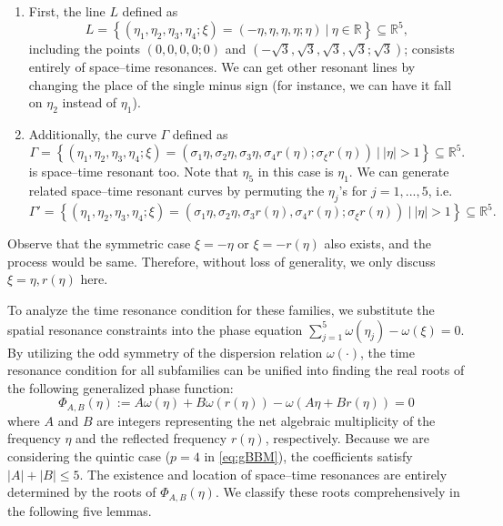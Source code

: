 \documentclass[reqno,english,11pt]{amsart}
\theoremstyle{definition}
\numberwithin{equation}{section}
\begin{document}
\begin{enumerate}
    \item First, the line $L$ defined as
    \begin{equation}
        L = \left\{\left(\eta_1,\eta_2,\eta_3,\eta_4;\xi\right) = \left(-\eta,\eta,\eta,\eta; \eta\right) \ | \ \eta\in \mathbb{R} \right\}\subseteq \mathbb{R}^5,
        \label{eqn:resonant_line_discussion}
    \end{equation}
    including the points $(0,0,0,0;0)$ and $\left(-\sqrt{3},\sqrt{3},\sqrt{3},\sqrt{3};\sqrt{3}\right)$;  consists entirely of space--time resonances. We can get other resonant lines by changing the place of the single minus sign (for instance, we can have it fall on $\eta_2$ instead of $\eta_1$). 
    \item Additionally, the curve $\Gamma$ defined as 
        \begin{equation}
    \Gamma =  \left\{\left(\eta_1,\eta_2,\eta_3,\eta_4;\xi\right) = \left(\sigma_1\eta,\sigma_2\eta,\sigma_3\eta,\sigma_4 r(\eta); \sigma_\xi r(\eta)\right) \ | \ \left|\eta\right|>1 \right\}\subseteq \mathbb{R}^5.
    \end{equation}
    is space--time resonant too. Note that $\eta_5$ in this case is $\eta_1$. We can generate related space--time resonant curves by permuting the $\eta_j$'s for $j=1,...,5$, i.e.
    \begin{equation}
    \Gamma' =  \left\{\left(\eta_1,\eta_2,\eta_3,\eta_4;\xi\right) = \left(\sigma_1\eta,\sigma_2\eta,\sigma_3r(\eta),\sigma_4 r(\eta); \sigma_\xi r(\eta)\right) \ | \ \left|\eta\right|>1 \right\}\subseteq \mathbb{R}^5.
    \end{equation}
\end{enumerate}
Observe that the symmetric case $\xi=-\eta$ or $\xi=-r(\eta)$ also exists, and the process would be same. Therefore, without loss of generality, we only discuss $\xi=\eta, r(\eta)$ here.

To analyze the time resonance condition for these families, we substitute the spatial resonance constraints into the phase equation $\sum_{j=1}^5 \omega(\eta_j) - \omega(\xi) = 0$. By utilizing the odd symmetry of the dispersion relation $\omega(\cdot)$, the time resonance condition for all subfamilies can be unified into finding the real roots of the following generalized phase function:
\begin{equation} \label{eq:generalized_phase}
    \Phi_{A,B}(\eta) := A\omega(\eta) + B\omega(r(\eta)) - \omega(A\eta + Br(\eta)) = 0
\end{equation}
where $A$ and $B$ are integers representing the net algebraic multiplicity of the frequency $\eta$ and the reflected frequency $r(\eta)$, respectively. Because we are considering the quintic case ($p=4$ in \eqref{eq:gBBM}), the coefficients satisfy $|A| + |B| \leq 5$. The existence and location of space--time resonances are entirely determined by the roots of $\Phi_{A,B}(\eta)$. We classify these roots comprehensively in the following five lemmas.
\end{document}

